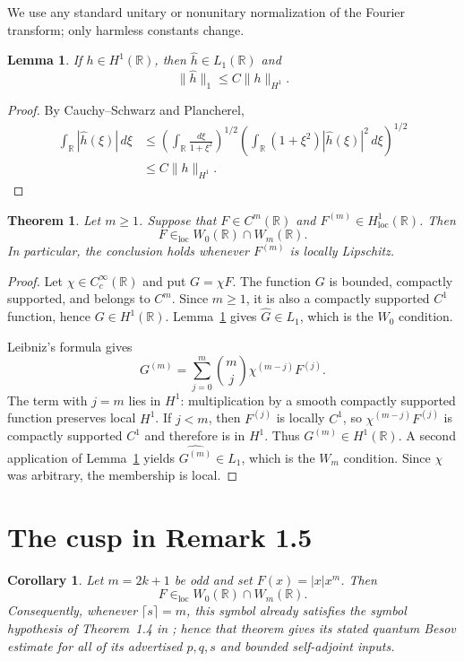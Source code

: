 \documentclass[11pt]{article}
\newtheorem{theorem}{Theorem}
\newtheorem{lemma}{Lemma}
\newtheorem{corollary}{Corollary}
\newcommand{\R}{\mathbb R}
\begin{document}
We use any standard unitary or nonunitary normalization of the Fourier
transform; only harmless constants change.

\begin{lemma}\label{lem:H1}
If $h\in H^1(\R)$, then $\widehat h\in L_1(\R)$ and
\[
 \|\widehat h\|_1\le C\|h\|_{H^1}.
\]
\end{lemma}

\begin{proof}
By Cauchy--Schwarz and Plancherel,
\begin{align*}
 \int_{\R}|\widehat h(\xi)|\,d\xi
 &\le
 \left(\int_{\R}\frac{d\xi}{1+\xi^2}\right)^{1/2}
 \left(\int_{\R}(1+\xi^2)|\widehat h(\xi)|^2\,d\xi\right)^{1/2}\\
 &\le C\|h\|_{H^1}.
\end{align*}
\end{proof}

\begin{theorem}\label{thm:criterion}
Let $m\ge1$. Suppose that $F\in C^m(\R)$ and
$F^{(m)}\in H^1_{\mathrm{loc}}(\R)$. Then
\[
             F\in_{\mathrm{loc}} W_0(\R)\cap W_m(\R).
\]
In particular, the conclusion holds whenever $F^{(m)}$ is locally Lipschitz.
\end{theorem}

\begin{proof}
Let $\chi\in C_c^\infty(\R)$ and put $G=\chi F$. The function $G$ is bounded,
compactly supported, and belongs to $C^m$. Since $m\ge1$, it is also a
compactly supported $C^1$ function, hence $G\in H^1(\R)$. Lemma~\ref{lem:H1}
gives $\widehat G\in L_1$, which is the $W_0$ condition.

Leibniz's formula gives
\[
 G^{(m)}=\sum_{j=0}^{m}\binom mj\chi^{(m-j)}F^{(j)}.
\]
The term with $j=m$ lies in $H^1$: multiplication by a smooth compactly
supported function preserves local $H^1$. If $j<m$, then $F^{(j)}$ is locally
$C^1$, so $\chi^{(m-j)}F^{(j)}$ is compactly supported $C^1$ and therefore is
in $H^1$. Thus $G^{(m)}\in H^1(\R)$. A second application of
Lemma~\ref{lem:H1} yields $\widehat{G^{(m)}}\in L_1$, which is the $W_m$
condition. Since $\chi$ was arbitrary, the membership is local.
\end{proof}

\section{The cusp in Remark 1.5}

\begin{corollary}\label{cor:cusp}
Let $m=2k+1$ be odd and set $F(x)=|x|x^m$. Then
\[
       F\in_{\mathrm{loc}}W_0(\R)\cap W_m(\R).
\]
Consequently, whenever $\lceil s\rceil=m$, this symbol already satisfies the
symbol hypothesis of Theorem~1.4 in \cite{ChenHong}; hence that theorem gives
its stated quantum Besov estimate for all of its advertised $p,q,s$ and
bounded self-adjoint inputs.
\end{corollary}
\end{document}

